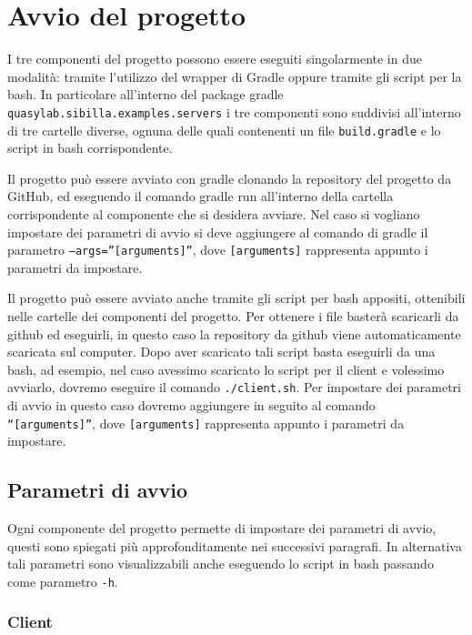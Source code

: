 

\section{Avvio del progetto}
I tre componenti del progetto possono essere eseguiti singolarmente in due modalità: tramite l’utilizzo del wrapper di Gradle oppure tramite gli script per la bash. In particolare all’interno del package gradle \texttt{quasylab.sibilla.examples.servers} i tre componenti sono suddivisi all’interno di tre cartelle diverse, ognuna delle quali contenenti un file \texttt{build.gradle} e lo script in bash corrispondente.

Il progetto può essere avviato con gradle clonando la repository del progetto da GitHub, ed eseguendo il comando gradle run all’interno della cartella corrispondente al componente che si desidera avviare. Nel caso si vogliano impostare dei parametri di avvio si deve aggiungere al comando di gradle il parametro \texttt{--args=”[arguments]”}, dove \texttt{[arguments]} rappresenta appunto i parametri da impostare.

Il progetto può essere avviato anche tramite gli script per bash appositi, ottenibili nelle cartelle dei componenti del progetto. Per ottenere i file basterà scaricarli da github ed eseguirli, in questo caso la repository da github viene automaticamente scaricata sul computer. Dopo aver scaricato tali script basta eseguirli da una bash, ad esempio, nel caso avessimo scaricato lo script per il client e volessimo avviarlo, dovremo eseguire il comando \texttt{./client.sh}. Per impostare dei parametri di avvio in questo caso dovremo aggiungere in seguito al comando \texttt{“[arguments]”}, dove \texttt{[arguments]} rappresenta appunto i parametri da impostare.

\subsection{Parametri di avvio}

Ogni componente del progetto permette di impostare dei parametri di avvio, questi sono spiegati più approfonditamente nei successivi paragrafi. In alternativa tali parametri sono visualizzabili anche eseguendo lo script in bash passando come parametro \texttt{-h}.

\subsubsection{Client}

